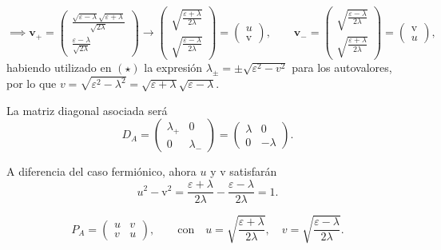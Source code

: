 \documentclass{scrartcl}
\renewcommand{\vb}[1]{\bm{#1}}
\DeclareRobustCommand{\[}{\begin{equation}}
\DeclareRobustCommand{\]}{\end{equation}}
\begin{document}
\begin{enumerate}
\begin{enumerate}
\begin{enumerate}[(i)]
{                \[ \implies \vb{v}_+ = \begin{pmatrix} \frac{\sqrt{\varepsilon - \lambda} \sqrt{\varepsilon + \lambda}}{\sqrt{2\lambda}} \\ \frac{\varepsilon - \lambda}{\sqrt{2\lambda}} \end{pmatrix} \longrightarrow \begin{pmatrix} \sqrt{\frac{\varepsilon + \lambda}{2\lambda}} \\ \sqrt{\frac{\varepsilon - \lambda}{2\lambda}} \end{pmatrix} = \begin{pmatrix} u \\ \mathrm{v} \end{pmatrix}, \quad\quad \vb{v}_- = \begin{pmatrix} \sqrt{\frac{\varepsilon - \lambda}{2\lambda}} \\ \sqrt{\frac{\varepsilon + \lambda}{2\lambda}} \end{pmatrix} = \begin{pmatrix} \mathrm{v} \\ u \end{pmatrix}, \]
                habiendo utilizado en $(\star)$ la expresión $\lambda_\pm = \pm \sqrt{\varepsilon^2 - v^2}$ para los autovalores, por lo que $v = \sqrt{\varepsilon^2 - \lambda^2} = \sqrt{\varepsilon + \lambda} \sqrt{\varepsilon - \lambda}$.
                
                La matriz diagonal asociada será
                \[ D_A = \begin{pmatrix} \lambda_+ & 0 \\ 0 & \lambda_- \end{pmatrix} = \begin{pmatrix} \lambda & 0 \\ 0 & -\lambda \end{pmatrix}. \]
                
                A diferencia del caso fermiónico, ahora $u$ y $\mathrm{v}$ satisfarán
                \[ u^2 - \mathrm{v}^2 = \frac{\varepsilon + \lambda}{2\lambda} - \frac{\varepsilon - \lambda}{2\lambda} = 1. \]
            }
            \[ P_A = \begin{pmatrix} u & v \\ v & u \end{pmatrix}, \quad\quad \text{con} \quad u = \sqrt{\frac{\varepsilon + \lambda}{2\lambda}}, \quad v = \sqrt{\frac{\varepsilon - \lambda}{2\lambda}}. \]
            

\end{enumerate}
\end{enumerate}
\end{enumerate}
\end{document}
